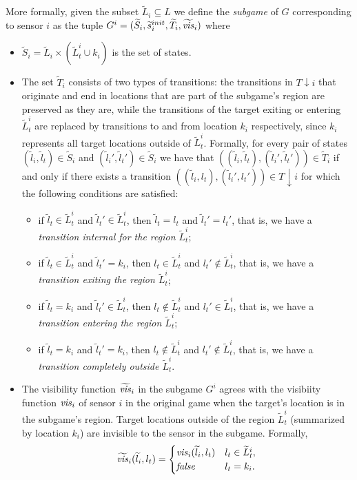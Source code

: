 More formally, given the subset  $\widetilde{L}_i \subseteq L$ we define the \emph{subgame} of $G$ corresponding to sensor $i$ as the tuple $G^i = (\widetilde{S}_i,\widetilde{s}_i^{init},\widetilde{T}_i,\widetilde{\mathit{vis}}_i)$  where
\begin{itemize}
\item $\widetilde{S}_i= \widetilde{L}_i \times (\widetilde{L}^i_t \cup k_i)$ is the set of states.
\item The set $\widetilde{T}_i$ consists of two types of transitions: the transitions in $T{\downarrow } i$ that originate and end in locations that are part of the subgame's region are preserved as they are, while the transitions of the target exiting or entering $\widetilde{L}^i_t$ are replaced by transitions to and from location $k_i$ respectively, since $k_i$ represents all target locations outside of  $\widetilde{L}^i_t$. 
Formally, for every pair of states $(\widetilde{l}_i,\widetilde{l}_t) \in \widetilde{S}_i$ and $(\widetilde{l}_i',\widetilde{l}_t') \in \widetilde{S}_i$ we have that $((\widetilde{l}_i,\widetilde l_t),(\widetilde{l}_i',\widetilde l_t')) \in \widetilde T_i$ if and only if there exists a transition
 $((\widetilde{l}_i,l_t),(\widetilde{l}_i',l_t')) \in T{\downarrow}i$ for which the following conditions are satisfied:
 \begin{itemize}
 \item if $\widetilde l_t \in \widetilde L_t ^i$ and $\widetilde l_t' \in \widetilde L_t ^i$, then 
 $\widetilde l_t = l_t$ and $\widetilde l_t'= l_t'$, that is, we have a \emph{transition internal for the region $\widetilde L_t^i$};
 \item if $\widetilde l_t \in \widetilde L_t ^i$ and $\widetilde l_t' =  k_i$, then 
 $l_t \in \widetilde L_t^i$ and $l_t' \not\in \widetilde L_t^i$, that is, we have a \emph{transition exiting the region $\widetilde L_t^i$}; 
 \item if $\widetilde l_t= k_i$ and $\widetilde l_t' \in  \widetilde L_t ^i$, then 
 $l_t \not \in \widetilde L_t^i$ and $l_t' \in \widetilde L_t^i$, that is, we have a \emph{transition entering the region $\widetilde L_t^i$}; 
 \item if $\widetilde l_t= k_i$ and $\widetilde l_t' =  k_i$, then 
 $l_t \not \in \widetilde L_t^i$ and $l_t' \not\in \widetilde L_t^i$, that is, we have a \emph{transition completely outside $\widetilde L_t^i$}.
\end{itemize}  

  \item The visibility function $\widetilde{\mathit{vis}}_i$ in the subgame $G^i$ agrees with the visibiity function $\mathit{vis}_i$ of sensor $i$ in the original game when the target's location is in the subgame's region. Target locations outside of the region $\widetilde L_t^i$  (summarized by location $k_i$) are invisible to the sensor in the subgame. Formally, 
 \[\widetilde{\mathit{vis}}_i(\widetilde{l}_i,l_t) = \begin{cases}
\mathit{vis}_i(\widetilde{l}_i,l_t) & l_t \in \widetilde{L}_t^i, \\
\mathit{false} & l_t  = k_i.
\end{cases}
\]
\end{itemize}
